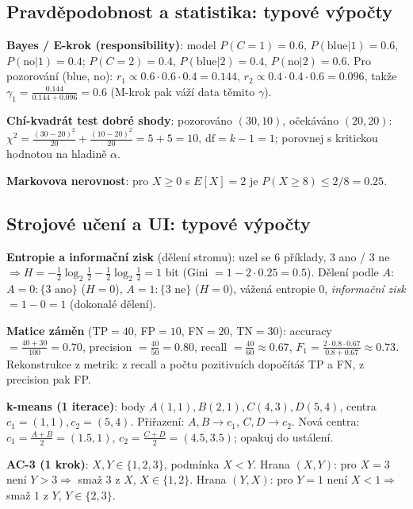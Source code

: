 \subsection{Pravděpodobnost a statistika: typové výpočty}
\begin{odpoved}
\setlength{\parskip}{2pt}
\noindent\textbf{Bayes / E-krok (responsibility)}: model $P(C{=}1)=0.6$,
$P(\text{blue}|1)=0.6$, $P(\text{no}|1)=0.4$; $P(C{=}2)=0.4$, $P(\text{blue}|2)=0.4$,
$P(\text{no}|2)=0.6$. Pro pozorování (blue, no):
$r_1\propto 0.6\cdot0.6\cdot0.4=0.144$, $r_2\propto 0.4\cdot0.4\cdot0.6=0.096$, takže
$\gamma_1=\tfrac{0.144}{0.144+0.096}=0.6$ (M-krok pak váží data těmito $\gamma$).\par
\noindent\textbf{Chí-kvadrát test dobré shody}: pozorováno $(30,10)$, očekáváno $(20,20)$:
$\chi^2=\tfrac{(30-20)^2}{20}+\tfrac{(10-20)^2}{20}=5+5=10$, $\mathrm{df}=k-1=1$; porovnej s
kritickou hodnotou na hladině $\alpha$.\par
\noindent\textbf{Markovova nerovnost}: pro $X\ge0$ s $E[X]=2$ je $P(X\ge8)\le 2/8=0.25$.
\end{odpoved}

\subsection{Strojové učení a UI: typové výpočty}
\begin{odpoved}
\setlength{\parskip}{2pt}
\noindent\textbf{Entropie a informační zisk} (dělení stromu): uzel se 6 příklady, 3 ano /
3 ne $\Rightarrow H=-\tfrac12\log_2\tfrac12-\tfrac12\log_2\tfrac12=1$ bit (Gini $=1-2\cdot0.25=0.5$).
Dělení podle $A$: $A{=}0\!:\{3\text{ ano}\}$ ($H{=}0$), $A{=}1\!:\{3\text{ ne}\}$ ($H{=}0$),
vážená entropie $0$, \emph{informační zisk} $=1-0=1$ (dokonalé dělení).\par
\noindent\textbf{Matice záměn} (TP$=40$, FP$=10$, FN$=20$, TN$=30$): accuracy
$=\tfrac{40+30}{100}=0.70$, precision $=\tfrac{40}{50}=0.80$, recall $=\tfrac{40}{60}\approx0.67$,
$F_1=\tfrac{2\cdot0.8\cdot0.67}{0.8+0.67}\approx0.73$. Rekonstrukce z metrik: z recall a počtu
pozitivních dopočítáš TP a FN, z precision pak FP.\par
\noindent\textbf{k-means (1 iterace)}: body $A(1,1),B(2,1),C(4,3),D(5,4)$, centra
$c_1{=}(1,1),c_2{=}(5,4)$. Přiřazení: $A,B\to c_1$, $C,D\to c_2$. Nová centra:
$c_1=\tfrac{A+B}2=(1.5,1)$, $c_2=\tfrac{C+D}2=(4.5,3.5)$; opakuj do ustálení.\par
\noindent\textbf{AC-3 (1 krok)}: $X,Y\in\{1,2,3\}$, podmínka $X<Y$. Hrana $(X,Y)$: pro $X{=}3$
není $Y{>}3 \Rightarrow$ smaž $3$ z $X$, $X\in\{1,2\}$. Hrana $(Y,X)$: pro $Y{=}1$ není
$X{<}1\Rightarrow$ smaž $1$ z $Y$, $Y\in\{2,3\}$.
\end{odpoved}

